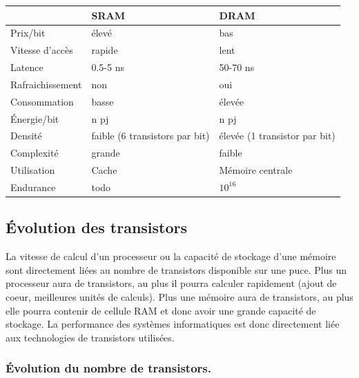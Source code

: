 \begin{table}[]
\begin{tabular}{l|l|l|}
\cline{2-3}
                                       & SRAM     & DRAM             \\ \hline
\multicolumn{1}{|l|}{Prix/bit}         & élevé    & bas              \\ \hline
\multicolumn{1}{|l|}{Vitesse d'accès}  & rapide   & lent             \\ \hline
\multicolumn{1}{|l|}{Latence}          & 0.5-5 ns & 50-70 ns        \\ \hline
\multicolumn{1}{|l|}{Rafraichissement} & non      & oui              \\ \hline
\multicolumn{1}{|l|}{Consommation}     & basse    & élevée           \\ \hline
\multicolumn{1}{|l|}{Énergie/bit}      & n pj     & n pj             \\ \hline
\multicolumn{1}{|l|}{Densité}          & faible (6 transistors par bit)   & élevée (1 transistor par bit)          \\ \hline
\multicolumn{1}{|l|}{Complexité}       & grande   & faible           \\ \hline
\multicolumn{1}{|l|}{Utilisation}      & Cache    & Mémoire centrale \\ \hline
\multicolumn{1}{|l|}{Endurance}        & todo     & $10^{16}$           \\ \hline
\end{tabular}
\end{table}




\subsection{Évolution des transistors}


La vitesse de calcul d'un processeur ou la capacité de stockage d'une mémoire sont directement liées au nombre de transistors disponible sur une puce. 
Plus un processeur aura de transistors, au plus il pourra calculer rapidement (ajout de coeur, meilleures unités de calculs). Plus une mémoire aura de transistors, au plus elle pourra contenir de cellule RAM et donc avoir une grande capacité de stockage. La performance des systèmes informatiques est donc directement liée aux technologies de transistors utilisées. 


\subsubsection{Évolution du nombre de transistors.} \label{sec:moore}

